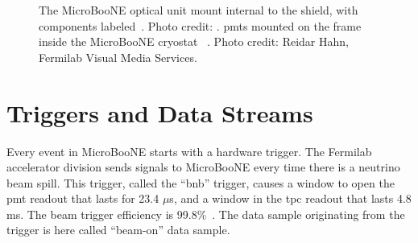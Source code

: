 
\begin{figure}[]
\centering
{} 
\caption[MicroBooNE Optical Unit]{The MicroBooNE optical unit mount internal to the shield, with components labeled~\protect{}. Photo credit: \cite{det}. \acrshort{pmt}s mounted on the frame inside the MicroBooNE cryostat ~\protect{}. Photo credit: Reidar Hahn, Fermilab Visual Media Services.}
\label{fig:pmt_pics}
\end{figure}




\section{Triggers and Data Streams}
\label{sec:trigger}

Every event in MicroBooNE starts with a hardware trigger. The Fermilab accelerator division sends signals to MicroBooNE every time there is a neutrino beam spill. This trigger, called the ``\acrshort{bnb}'' trigger, causes a window to open the \acrshort{pmt} readout that lasts for 23.4 $\mu$s, and a window in the \acrshort{tpc} readout that lasts 4.8 ms. The beam trigger efficiency is 99.8\%~\cite{CaratelliThesis}. The data sample originating from the trigger is here called ``beam-on'' data sample.

